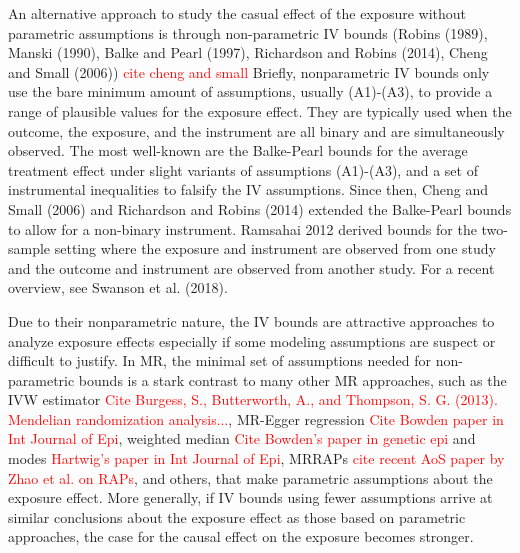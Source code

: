 \documentclass[
]{article}
\theoremstyle{plain}
\begin{document}
An alternative approach to study the casual effect of the exposure without parametric assumptions is through non-parametric IV bounds (Robins (1989), Manski (1990), Balke and Pearl (1997), Richardson and Robins (2014), Cheng and Small (2006)) \textcolor{red}{cite cheng and small} Briefly, nonparametric IV bounds only use the bare minimum amount of assumptions, usually (A1)-(A3), to provide a range of plausible values for the exposure effect. They are typically used when the outcome, the exposure, and the instrument are all binary and are simultaneously observed. The most well-known are the Balke-Pearl bounds for the average treatment effect under slight variants of assumptions (A1)-(A3), and a set of instrumental inequalities to falsify the IV assumptions. Since then, Cheng and Small (2006) and Richardson and Robins (2014) extended the Balke-Pearl bounds to allow for a non-binary instrument. Ramsahai 2012 derived bounds for the two-sample setting where the exposure and instrument are observed from one study and the outcome and instrument are observed from another study. %
For a recent overview, see Swanson et al. (2018). 

Due to their nonparametric nature, the IV bounds are attractive approaches to analyze exposure effects especially if some modeling assumptions are suspect or difficult to justify. In MR, the minimal set of assumptions needed for non-parametric bounds is a stark contrast to many other MR approaches, such as the IVW estimator \textcolor{red}{Cite Burgess, S., Butterworth, A., and Thompson, S. G. (2013). Mendelian randomization analysis...}, MR-Egger regression \textcolor{red}{Cite Bowden paper in Int Journal of Epi}, weighted median \textcolor{red}{Cite Bowden's paper in genetic epi} and modes \textcolor{red}{Hartwig's paper in Int Journal of Epi}, MRRAPs \textcolor{red}{cite recent AoS paper by Zhao et al. on RAPs}, and others, that make parametric assumptions about the exposure effect. More generally, if IV bounds using fewer assumptions arrive at similar conclusions about the exposure effect as those based on parametric approaches, the case for the causal effect on the exposure becomes stronger.
\end{document}
